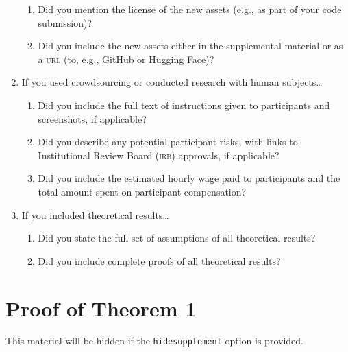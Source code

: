 \documentclass[11pt]{article}
\begin{document}
\begin{enumerate}
  \begin{enumerate}
    \item Did you mention the license of the new assets (e.g., as part of your code submission)?
    \answerTODO{}
    \item Did you include the new assets either in the supplemental material or as
    a \textsc{url} (to, e.g., GitHub or Hugging Face)?
    \answerTODO{}
  \end{enumerate}
\item If you used crowdsourcing or conducted research with human subjects\dots
  \begin{enumerate}
  \item Did you include the full text of instructions given to participants and
    screenshots, if applicable?
    \answerTODO{}
  \item Did you describe any potential participant risks, with links to
    Institutional Review Board (\textsc{irb}) approvals, if applicable?
    \answerTODO{}
  \item Did you include the estimated hourly wage paid to participants and the
    total amount spent on participant compensation?
    \answerTODO{}
  \end{enumerate}
\item If you included theoretical results\dots
  \begin{enumerate}
  \item Did you state the full set of assumptions of all theoretical results?
    \answerTODO{}
  \item Did you include complete proofs of all theoretical results?
    \answerTODO{}
  \end{enumerate}
\end{enumerate}

\newpage
\appendix
\section{Proof of Theorem 1}

This material will be hidden if the \texttt{hidesupplement} option is provided.
\end{document}
